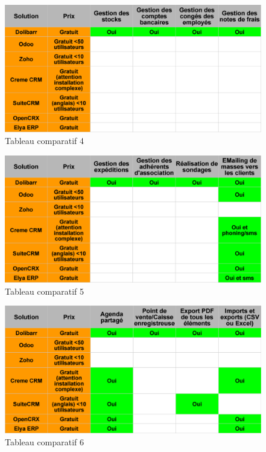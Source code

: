 \documentclass[report]{tnreport}
\begin{document}
\begin{figure}[h]
  \centering
  \includegraphics[width=13cm]{figures/compare4}
  \caption{Tableau comparatif 4}
  \label{fig:compare4}
\end{figure}
\begin{figure}[h]
  \centering
  \includegraphics[width=13cm]{figures/compare5}
  \caption{Tableau comparatif 5}
  \label{fig:compare5}
\end{figure}
\begin{figure}[h]
  \centering
  \includegraphics[width=13cm]{figures/compare6}
  \caption{Tableau comparatif 6}
  \label{fig:compare6}
\end{figure}
\end{document}
